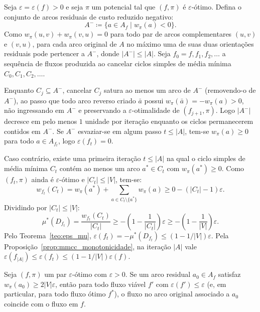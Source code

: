 \begin{demonstracao}
Seja $\varepsilon = \varepsilon(f) > 0$ e seja $\pi$ um potencial tal que $(f, \pi)$ é $\varepsilon$-ótimo. Defina o conjunto de arcos residuais de custo reduzido negativo:
\begin{equation*}
    A^- \coloneqq \bigl\{ a \in A_f \mid w_\pi(a) < 0 \bigr\}.
\end{equation*}
Como $w_\pi(u,v) + w_\pi(v,u) = 0$ para todo par de arcos complementares $(u,v)$ e $(v,u)$, para cada arco original de $A$ no máximo uma de suas duas orientações residuais pode pertencer a $A^-$, donde $|A^-| \le |A|$. Seja $f_0 = f, f_1, f_2, \dots$ a sequência de fluxos produzida ao cancelar ciclos simples de média mínima $C_0, C_1, C_2, \dots$.

Enquanto $C_j \subseteq A^-$, cancelar $C_j$ satura ao menos um arco de $A^-$ (removendo-o de $A^-$), ao passo que todo arco reverso criado $\bar{a}$ possui $w_\pi(\bar{a}) = -w_\pi(a) > 0$, não ingressando em $A^-$ e preservando a $\varepsilon$-otimalidade de $(f_{j+1}, \pi)$. Logo $|A^-|$ decresce em pelo menos $1$ unidade por iteração enquanto os ciclos permanecerem contidos em $A^-$. Se $A^-$ esvaziar-se em algum passo $t \le |A|$, tem-se $w_\pi(a) \ge 0$ para todo $a \in A_{f_t}$, logo $\varepsilon(f_t) = 0$.

Caso contrário, existe uma primeira iteração $t \le |A|$ na qual o ciclo simples de média mínima $C_t$ contém ao menos um arco $a^* \in C_t$ com $w_\pi(a^*) \ge 0$. Como $(f_t, \pi)$ ainda é $\varepsilon$-ótimo e $|C_t| \le |V|$, tem-se:
\begin{equation*}
    w_{f_t}(C_t) = w_\pi(a^*) + \sum_{a \in C_t \setminus \{a^*\}} w_\pi(a) \ge 0 - (|C_t| - 1)\varepsilon.
\end{equation*}
Dividindo por $|C_t| \le |V|$:
\begin{equation*}
    \mu^*(D_{f_t}) = \frac{w_{f_t}(C_t)}{|C_t|} \ge -\left(1 - \frac{1}{|C_t|}\right)\varepsilon \ge -\left(1 - \frac{1}{|V|}\right)\varepsilon.
\end{equation*}
Pelo Teorema~\ref{teo:eps_mu}, $\varepsilon(f_t) = -\mu^*(D_{f_t}) \le (1 - 1/|V|)\varepsilon$. Pela Proposição~\ref{prop:mmcc_monotonicidade}, na iteração $|A|$ vale $\varepsilon(f_{|A|}) \le \varepsilon(f_t) \le (1 - 1/|V|)\varepsilon(f)$.
\end{demonstracao}

\begin{prop}\label{prop:arcos_fixos}
Seja $(f, \pi)$ um par $\varepsilon$-ótimo com $\varepsilon > 0$. Se um arco residual $a_0 \in A_f$ satisfaz $w_\pi(a_0) \ge 2|V|\varepsilon$, então para todo fluxo viável $f'$ com $\varepsilon(f') \le \varepsilon$ (e, em particular, para todo fluxo ótimo $f^*$), o fluxo no arco original associado a $a_0$ coincide com o fluxo em $f$.
\end{prop}

